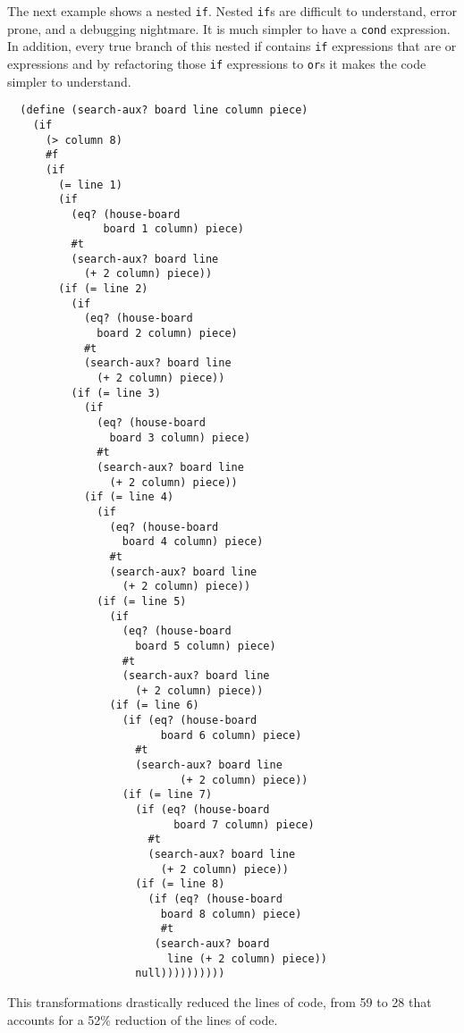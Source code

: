 The next example shows a nested {\tt if}. Nested {\tt if}s are
 difficult to understand, error prone, and a debugging nightmare.
It is much simpler to have a {\tt cond} expression.
In addition, every true branch of this nested if contains {\tt if} expressions that are
or expressions and by refactoring those {\tt if} expressions to {\tt or}s it makes the code
simpler to understand.
\begin{lstlisting}
  (define (search-aux? board line column piece)
    (if
      (> column 8)
      #f
      (if
        (= line 1)
        (if
          (eq? (house-board
               board 1 column) piece)
          #t
          (search-aux? board line
            (+ 2 column) piece))
        (if (= line 2)
          (if
            (eq? (house-board
              board 2 column) piece)
            #t
            (search-aux? board line
              (+ 2 column) piece))
          (if (= line 3)
            (if
              (eq? (house-board
                board 3 column) piece)
              #t
              (search-aux? board line
                (+ 2 column) piece))
            (if (= line 4)
              (if
                (eq? (house-board
                  board 4 column) piece)
                #t
                (search-aux? board line
                  (+ 2 column) piece))
              (if (= line 5)
                (if
                  (eq? (house-board
                    board 5 column) piece)
                  #t
                  (search-aux? board line
                    (+ 2 column) piece))
                (if (= line 6)
                  (if (eq? (house-board
                        board 6 column) piece)
                    #t
                    (search-aux? board line
                           (+ 2 column) piece))
                  (if (= line 7)
                    (if (eq? (house-board
                          board 7 column) piece)
                      #t
                      (search-aux? board line
                        (+ 2 column) piece))
                    (if (= line 8)
                      (if (eq? (house-board
                        board 8 column) piece)
                        #t
                       (search-aux? board
                         line (+ 2 column) piece))
                    null))))))))))
\end{lstlisting}

This transformations drastically reduced the lines of code, from 59 to 28 that accounts
for a 52\% reduction of the lines of code.

